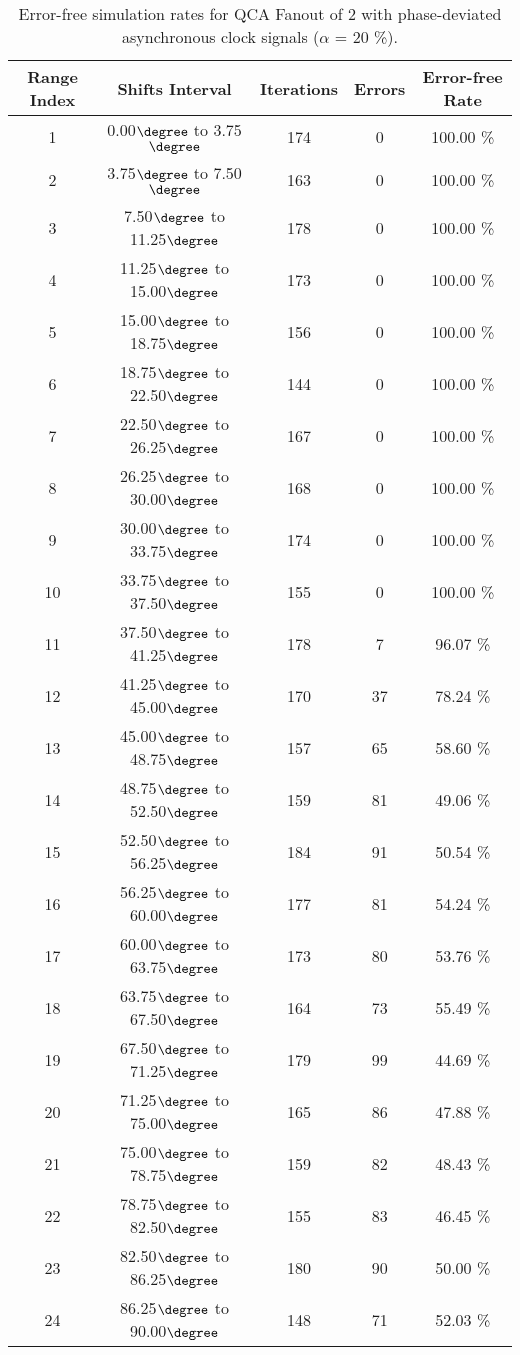 \flushleft
\begin{table}[h]
\begin{center}
\caption{Error-free simulation rates for QCA Fanout of 2 with phase-deviated asynchronous clock signals ($\alpha$ = 20 \%).}
\begin{tabular}{|c|c|c|c|c|}
\hline
\textbf{Range Index} & \textbf{Shifts Interval} & \textbf{Iterations} & \textbf{Errors} & \textbf{Error-free Rate} \\
\hline
1  &  0.00$\degree$ to  3.75$\degree$ & 174 &  0 & 100.00 \% \\
\hline
2  &  3.75$\degree$ to  7.50$\degree$ & 163 &  0 & 100.00 \% \\
\hline
3  &  7.50$\degree$ to 11.25$\degree$ & 178 &  0 & 100.00 \% \\
\hline
4  & 11.25$\degree$ to 15.00$\degree$ & 173 &  0 & 100.00 \% \\
\hline
5  & 15.00$\degree$ to 18.75$\degree$ & 156 &  0 & 100.00 \% \\
\hline
6  & 18.75$\degree$ to 22.50$\degree$ & 144 &  0 & 100.00 \% \\
\hline
7  & 22.50$\degree$ to 26.25$\degree$ & 167 &  0 & 100.00 \% \\
\hline
8  & 26.25$\degree$ to 30.00$\degree$ & 168 &  0 & 100.00 \% \\
\hline
9  & 30.00$\degree$ to 33.75$\degree$ & 174 &  0 & 100.00 \% \\
\hline
10 & 33.75$\degree$ to 37.50$\degree$ & 155 &  0 & 100.00 \% \\
\hline
11 & 37.50$\degree$ to 41.25$\degree$ & 178 &  7 &  96.07 \% \\
\hline
12 & 41.25$\degree$ to 45.00$\degree$ & 170 & 37 &  78.24 \% \\
\hline
13 & 45.00$\degree$ to 48.75$\degree$ & 157 & 65 &  58.60 \% \\
\hline
14 & 48.75$\degree$ to 52.50$\degree$ & 159 & 81 &  49.06 \% \\
\hline
15 & 52.50$\degree$ to 56.25$\degree$ & 184 & 91 &  50.54 \% \\
\hline
16 & 56.25$\degree$ to 60.00$\degree$ & 177 & 81 &  54.24 \% \\
\hline
17 & 60.00$\degree$ to 63.75$\degree$ & 173 & 80 &  53.76 \% \\
\hline
18 & 63.75$\degree$ to 67.50$\degree$ & 164 & 73 &  55.49 \% \\
\hline
19 & 67.50$\degree$ to 71.25$\degree$ & 179 & 99 &  44.69 \% \\
\hline
20 & 71.25$\degree$ to 75.00$\degree$ & 165 & 86 &  47.88 \% \\
\hline
21 & 75.00$\degree$ to 78.75$\degree$ & 159 & 82 &  48.43 \% \\
\hline
22 & 78.75$\degree$ to 82.50$\degree$ & 155 & 83 &  46.45 \% \\
\hline
23 & 82.50$\degree$ to 86.25$\degree$ & 180 & 90 &  50.00 \% \\
\hline
24 & 86.25$\degree$ to 90.00$\degree$ & 148 & 71 &  52.03 \% \\
\hline


\end{tabular}
\end{center}
\end{table}
